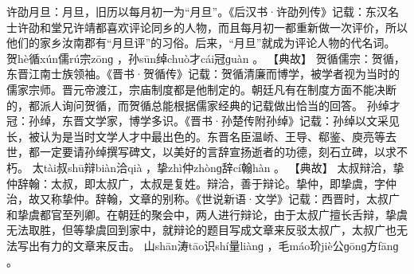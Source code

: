 \documentclass[12pt,UTF8]{ctexbook}
\begin{document}
许劭月旦：月旦，旧历以每月初一为“月旦”。《后汉书·许劭列传》记载：东汉名士许劭和堂兄许靖都喜欢评论同乡的人物，而且每月初一都重新做一次评价，所以他们的家乡汝南郡有“月旦评”的习俗。后来，“月旦”就成为评论人物的代名词。
贺hè循xún儒rú宗zōnɡ
，孙sūn绰chuò才cái冠ɡuàn
。
【典故】
贺循儒宗：贺循，东晋江南士族领袖。《晋书·贺循传》记载：贺循清廉而博学，被学者视为当时的儒家宗师。晋元帝渡江，宗庙制度都是他制定的。朝廷凡有在制度方面不能决断的，都派人询问贺循，而贺循总能根据儒家经典的记载做出恰当的回答。
孙绰才冠：孙绰，东晋文学家，博学多识。《晋书·孙楚传附孙绰》记载：孙绰以文采见长，被认为是当时文学人才中最出色的。东晋名臣温峤、王导、郗鉴、庾亮等去世，都一定要请孙绰撰写碑文，以美好的言辞宣扬逝者的功德，刻石立碑，以求不朽。
太tài叔shū辩biàn洽qià
，挚zhì仲zhònɡ辞cí翰hàn
。
【典故】
太叔辩洽，挚仲辞翰：太叔，即太叔广，太叔是复姓。辩洽，善于辩论。挚仲，即挚虞，字仲治，故又称挚仲。辞翰，文章的别称。《世说新语·文学》记载：西晋时，太叔广和挚虞都官至列卿。在朝廷的聚会中，两人进行辩论，由于太叔广擅长舌辩，挚虞无法取胜，但等挚虞回到家中，就辩论的题目写成文章来反驳太叔广，太叔广也无法写出有力的文章来反击。
山shān涛tāo识shí量liànɡ
，毛máo玠jiè公ɡōnɡ方fānɡ
。
\end{document}
